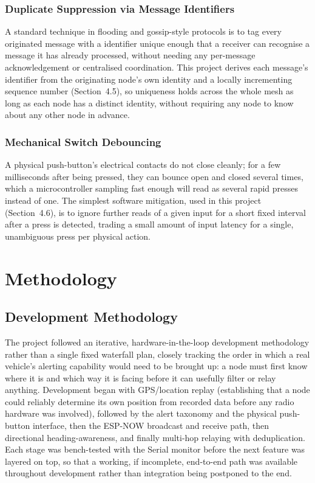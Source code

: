 \documentclass[12pt,a4paper]{report}
\begin{document}
\subsection{Duplicate Suppression via Message Identifiers}
A standard technique in flooding and gossip-style protocols is to tag every originated message with a identifier unique enough that a receiver can recognise a message it has already processed, without needing any per-message acknowledgement or centralised coordination. This project derives each message's identifier from the originating node's own identity and a locally incrementing sequence number (Section~4.5), so uniqueness holds across the whole mesh as long as each node has a distinct identity, without requiring any node to know about any other node in advance.

\subsection{Mechanical Switch Debouncing}
A physical push-button's electrical contacts do not close cleanly; for a few milliseconds after being pressed, they can bounce open and closed several times, which a microcontroller sampling fast enough will read as several rapid presses instead of one. The simplest software mitigation, used in this project (Section~4.6), is to ignore further reads of a given input for a short fixed interval after a press is detected, trading a small amount of input latency for a single, unambiguous press per physical action.

\chapter{Methodology}

\section{Development Methodology}
The project followed an iterative, hardware-in-the-loop development methodology rather than a single fixed waterfall plan, closely tracking the order in which a real vehicle's alerting capability would need to be brought up: a node must first know where it is and which way it is facing before it can usefully filter or relay anything. Development began with GPS/location replay (establishing that a node could reliably determine its own position from recorded data before any radio hardware was involved), followed by the alert taxonomy and the physical push-button interface, then the ESP-NOW broadcast and receive path, then directional heading-awareness, and finally multi-hop relaying with deduplication. Each stage was bench-tested with the Serial monitor before the next feature was layered on top, so that a working, if incomplete, end-to-end path was available throughout development rather than integration being postponed to the end.
\end{document}
